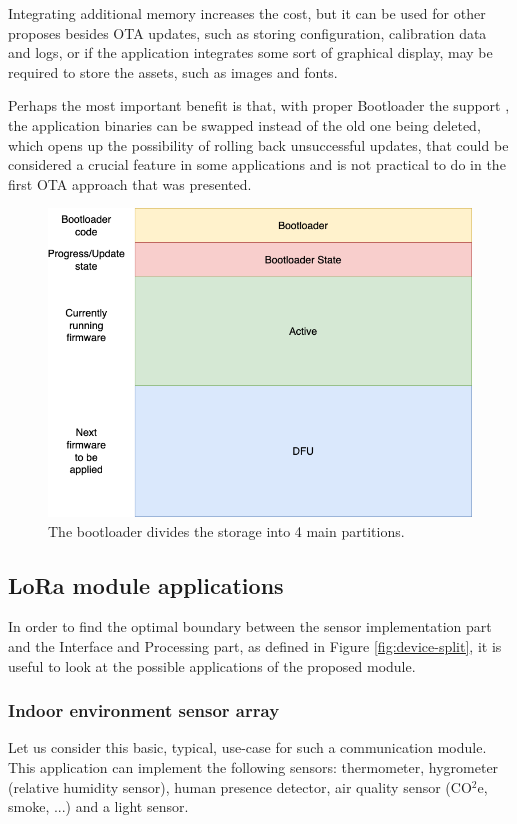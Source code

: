 Integrating additional memory increases the cost, but it can be used for other proposes besides OTA updates, such as storing configuration, calibration data and logs, or if the application integrates some sort of graphical display, may be required to store the assets, such as images and fonts.

Perhaps the most important benefit is that, with proper Bootloader the support \cite{drogue_iot_firmware_2024,embassy_project_documentation_bootloader_2024}, the application binaries can be swapped instead of the old one being deleted, which opens up the possibility of rolling back unsuccessful updates, that could be considered a crucial feature in some applications and is not practical to do in the first OTA approach that was presented.

\begin{figure}
    \includegraphics[width=.6\textwidth]{fig/bootloader_flash.png}
    \caption{\label{fig:bootloader-flash}The bootloader divides the storage into 4 main partitions.}
\end{figure}

\subsection{\label{section:application-case-studies}LoRa module applications}
In order to find the optimal boundary between the sensor implementation part and the Interface and Processing part, as defined in Figure \ref{fig:device-split}, it is useful to look at the possible applications of the proposed module.

\subsubsection{Indoor environment sensor array}
Let us consider this basic, typical, use-case for such a communication module. This application can implement the following sensors: thermometer, hygrometer (relative humidity sensor), human presence detector, air quality sensor (CO$^2$e, smoke, ...) and a light sensor.

